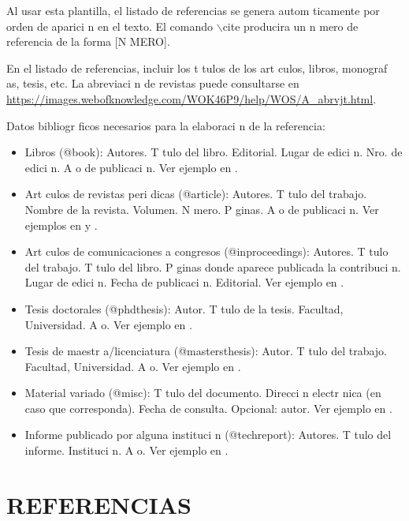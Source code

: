 \documentclass{article}
\begin{document}
Al usar esta plantilla, el listado de referencias se genera autom ticamente por orden de aparici n en el texto. 
El comando \color{Blue} \textsf{$\backslash$cite} \color{Black} producira un n mero de referencia de la forma [\color{blue}N MERO\color{Black}]. 

En el listado de referencias, incluir los t tulos de los art culos, libros, monograf as, tesis, etc. La abreviaci n de revistas puede consultarse en \url{https://images.webofknowledge.com/WOK46P9/help/WOS/A_abrvjt.html}. 


Datos bibliogr ficos necesarios para la elaboraci n de la referencia:

\begin{itemize}[itemsep=1mm, parsep=0pt]
    \item Libros (@book): Autores. T tulo del libro. Editorial. Lugar de edici n. Nro. de edici n. A o de publicaci n. Ver ejemplo en \cite{libro1}.
    \item Art culos de revistas peri dicas (@article): Autores. T tulo del trabajo. Nombre de la revista. Volumen. N mero. P ginas. A o de publicaci n. Ver ejemplos en \cite{paper1} y \cite{paper2}.
    \item Art culos de comunicaciones a congresos (@inproceedings): Autores. T tulo del trabajo. T tulo del libro. P ginas donde aparece publicada la contribuci n. Lugar de edici n. Fecha de publicaci n. Editorial. Ver ejemplo en \cite{proceeding1}.
    \item Tesis doctorales (@phdthesis): Autor. T tulo de la tesis. Facultad, Universidad. A o. Ver ejemplo en \cite{tesis1}.
    \item Tesis de maestr a/licenciatura (@mastersthesis): Autor. T tulo del trabajo. Facultad, Universidad. A o. Ver ejemplo en \cite{maestria1}.
    \item Material variado (@misc): T tulo del documento. Direcci n electr nica (en caso que corresponda). Fecha de consulta. Opcional: autor. Ver ejemplo en \cite{motor}.
    \item Informe publicado por alguna instituci n (@techreport): Autores. T tulo del informe. Instituci n. A o. Ver ejemplo en \cite{informe1}.
\end{itemize}



\section*{REFERENCIAS} 
 \printbibliography[heading=none] 

\end{document}

